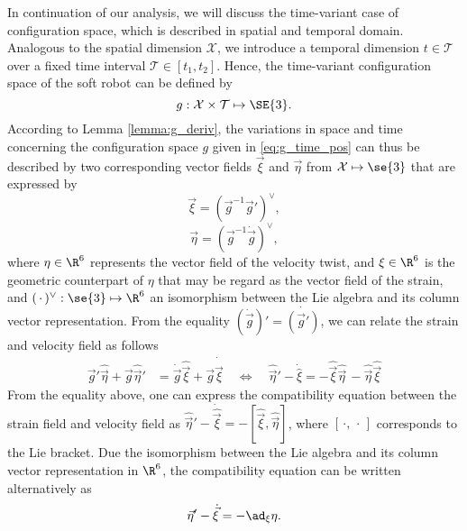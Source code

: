 In continuation of our analysis, we will discuss the time-variant case of configuration space, which is described in spatial and temporal domain. Analogous to the spatial dimension $\mathcal{X}$, we introduce a temporal dimension $t \in \mathcal{T}$ over a fixed time interval $\mathcal{T} \in [t_1, t_2]$. Hence, the time-variant configuration space of the soft robot can be defined by 
\begin{equation}
g: \mathcal{X} \times \mathcal{T} \mapsto \SE{3}.
\label{eq:g_time_pos}
\end{equation}
According to Lemma \ref{lemma:g_deriv}, the variations in space and time concerning the configuration space $g$ given in \eqref{eq:g_time_pos} can thus be described by two corresponding vector fields $\vec{\xi}$ and $\vec{\eta}$ from $\mathcal{X} \mapsto \se{3}$ that are expressed by
\begin{equation}
{\vec{\xi}} = \left( \vec{g}^{-1} \vec{g}'\right)^\vee,
\end{equation}
\begin{equation}
{\vec{\eta}} = \left( \vec{g}^{-1} \dot{\vec{g}}\right)^\vee,
\end{equation}
where $\eta \in \R^6$ represents the vector field of the velocity twist, and $\xi  \in \R^6$ is the geometric counterpart of $\eta$ that may be regard as the vector field of the strain, and $(\,\cdot\,)^\vee: \se{3} \mapsto \R^6$ an isomorphism between the Lie algebra and its column vector representation. From the equality $\left(\dot{\vec{g}} \right)' = \dot{\left( \vec{g}' \right)}$, we can relate the strain and velocity field as follows
\begin{align}
\vec{g}' \hat{\vec{\eta}} + \vec{g} \hat{\vec{\eta}}' & =  \dot{\vec{g}} \hat{\vec{\xi}} + \vec{g} \dot{\hat{\vec{\xi}}} \quad \Longleftrightarrow \quad
\hat{\vec{\eta}}' -  \dot{\hat{\xi}} = -\hat{\vec{\xi}}\hat{\vec{\eta}}\, - \hat{\vec{\eta}}\hat{\vec{\xi}}
\end{align}
From the equality above, one can express the compatibility equation between the strain field and velocity field as $\hat{\vec{\eta}}' - \dot{\hat{\vec{\xi}}} = - [\hat{\vec{\xi}},\hat{\vec{\eta}}]$, where $[\,\cdot,\,\cdot\,]$ corresponds to the Lie bracket. Due the isomorphism between the Lie algebra and its column vector representation in $\R^6$, the compatibility equation can be written alternatively as 
\begin{equation}
\vec{\eta}' - \dot{\vec{\xi}} = -\ad_{\xi} \eta. 
\end{equation}

